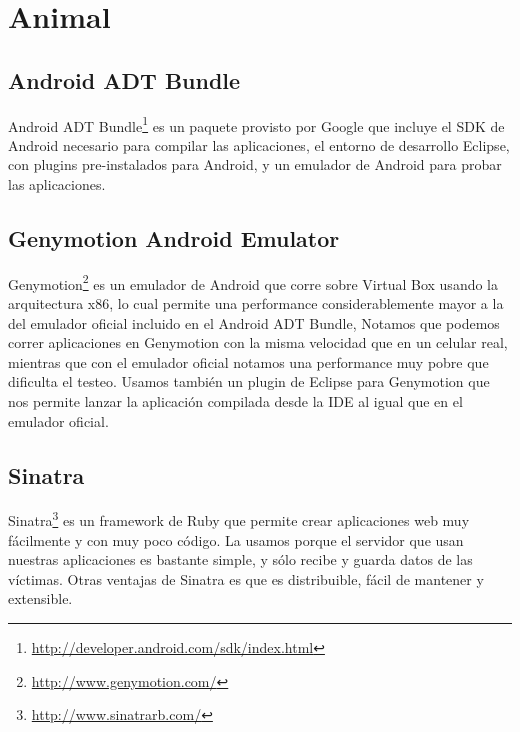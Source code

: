 \section{Animal}
	\subsection{Android ADT Bundle} 
		Android ADT Bundle\footnote{ \url{http://developer.android.com/sdk/index.html}} es un paquete provisto por Google que incluye el SDK de Android necesario para compilar las aplicaciones, el entorno de desarrollo Eclipse, con plugins pre-instalados para Android, y un emulador de Android para probar las aplicaciones.
		
	\subsection{Genymotion Android Emulator}
		Genymotion\footnote{\url{http://www.genymotion.com/}} es un emulador de Android que corre sobre Virtual Box usando la arquitectura x86, lo cual permite una performance considerablemente mayor a la del emulador oficial incluido en el Android ADT Bundle, Notamos que podemos correr aplicaciones en Genymotion con la misma velocidad que en un celular real, mientras que con el emulador oficial notamos una performance muy pobre que dificulta el testeo. Usamos también un plugin de Eclipse para Genymotion que nos permite lanzar la aplicación compilada desde la IDE al igual que en el emulador oficial.
		
	\subsection{Sinatra}
		Sinatra\footnote{\url{http://www.sinatrarb.com/}} es un framework de Ruby que permite crear aplicaciones web muy fácilmente y con muy poco código. La usamos porque el servidor que usan nuestras aplicaciones es bastante simple, y sólo recibe y guarda datos de las víctimas. Otras ventajas de Sinatra es que es distribuible, fácil de mantener y extensible.